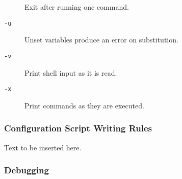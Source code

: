 \begin{description}
Exit after running one command. 

\item[{\tt -u}] \mbox{}

Unset variables produce an error on 
substitution. 

\item[{\tt -v}] \mbox{}

Print shell input as it is read. 

\item[{\tt -x}] \mbox{}

Print commands as they are executed. 

\end{description}





\subsubsection{Configuration Script Writing Rules}

Text to be inserted here.




\subsubsection{Debugging}



